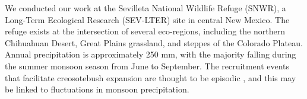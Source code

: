 \documentclass[11pt]{article}\usepackage[]{graphicx}\usepackage[usenames,dvipsnames]{xcolor}
\begin{document}
We conducted our work at the Sevilleta National Wildlife Refuge (SNWR), a Long-Term Ecological Research (SEV-LTER) site in central New Mexico.
The refuge exists at the intersection of several eco-regions, including the northern Chihuahuan Desert, Great Plains grassland, and steppes of the Colorado Plateau.
Annual precipitation is approximately 250 mm, with the majority falling during the summer monsoon season from June to September.
The recruitment events that facilitate creosotebush expansion are thought to be episodic \citep{peters2012long}, and this may be linked to fluctuations in monsoon precipitation\citep{boyd1983postdispersal, bowers2004temporal}.

\end{document}
